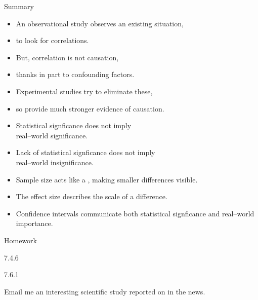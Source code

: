 \begin{frame}{Summary}

  \begin{itemize}
    \item An \alert{observational study} observes an existing situation,
    \item to look for correlations.
    \item But, \alert{correlation is not causation},
    \item thanks in part to \alert{confounding factors}.
    \item \alert{Experimental studies} try to eliminate these,
    \item so provide much stronger evidence of causation.
  \end{itemize}

    \vspace{1em}

    \begin{itemize}
        \item Statistical signficance \alert{does not imply} \\real--world significance.
        \item Lack of statistical signficance \alert{does not imply} \\real--world insignificance.
        \item Sample size acts like a , making smaller differences visible.
        \item The \alert{effect size} describes the scale of a difference.
        \item Confidence intervals communicate both statistical signficance and real--world importance.
    \end{itemize}
\end{frame}

\begin{frame}{Homework}

  \begin{center}

    7.4.6

  \vspace{2em}

    7.6.1

  \vspace{2em}

  Email me an interesting scientific study reported on in the news.

  \end{center}

\end{frame}









